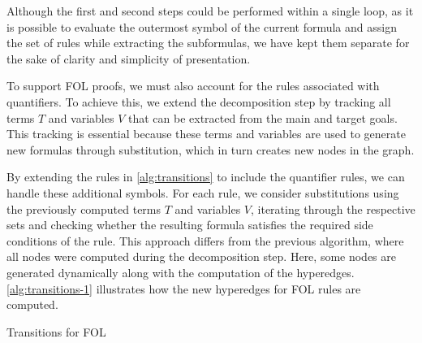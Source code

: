 Although the first and second steps could be performed within a single loop, as it is possible to evaluate the outermost symbol of the current formula and assign the set of rules while extracting the subformulas, we have kept them separate for the sake of clarity and simplicity of presentation.

To support \gls{FOL} proofs, we must also account for the rules associated with quantifiers. To achieve this, we extend the decomposition step by tracking all terms \(T\) and variables \(V\) that can be extracted from the main and target goals. This tracking is essential because these terms and variables are used to generate new formulas through substitution, which in turn creates new nodes in the graph. 

By extending the rules in \autoref{alg:transitions} to include the quantifier rules, we can handle these additional symbols. For each rule, we consider substitutions using the previously computed terms \(T\) and variables \(V\), iterating through the respective sets and checking whether the resulting formula satisfies the required side conditions of the rule. This approach differs from the previous algorithm, where all nodes were computed during the decomposition step. Here, some nodes are generated dynamically along with the computation of the hyperedges. \autoref{alg:transitions-1} illustrates how the new hyperedges for \gls{FOL} rules are computed.

\begin{algorithm}
\caption{Transitions for FOL}
\label{alg:transitions-1}


\end{algorithm}

